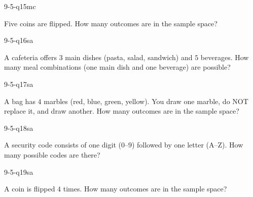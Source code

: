 \begin{practiceQuestion}{9-5-q15}{mc}
\begin{questionText}
Five coins are flipped. How many outcomes are in the sample space?
\end{questionText}
\end{practiceQuestion}


\begin{practiceQuestion}{9-5-q16}{sa}
\begin{questionText}
A cafeteria offers $3$ main dishes (pasta, salad, sandwich) and $5$ beverages. How many meal combinations (one main dish and one beverage) are possible?
\end{questionText}
\end{practiceQuestion}

\begin{practiceQuestion}{9-5-q17}{sa}
\begin{questionText}
A bag has $4$ marbles (red, blue, green, yellow). You draw one marble, do NOT replace it, and draw another. How many outcomes are in the sample space?
\end{questionText}
\end{practiceQuestion}

\begin{practiceQuestion}{9-5-q18}{sa}
\begin{questionText}
A security code consists of one digit ($0$--$9$) followed by one letter (A--Z). How many possible codes are there?
\end{questionText}
\end{practiceQuestion}

\begin{practiceQuestion}{9-5-q19}{sa}
\begin{questionText}
A coin is flipped $4$ times. How many outcomes are in the sample space?
\end{questionText}
\end{practiceQuestion}

